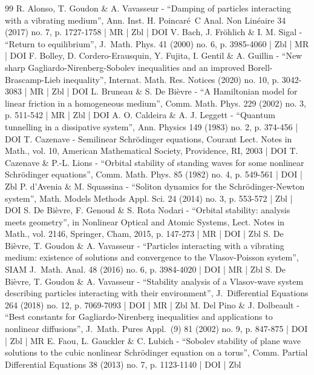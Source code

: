 \documentclass[10pt]{amsart}
\theoremstyle{definition}
\begin{document}
\begin{thebibliography}{99}
R. Alonso, T. Goudon \& A. Vavasseur - “Damping of particles interacting with a vibrating medium”, Ann. Inst. H. Poincaré C Anal. Non Linéaire 34 (2017) no. 7, p. 1727-1758 | MR | Zbl | DOI
V. Bach, J. Fröhlich \& I. M. Sigal - “Return to equilibrium”, J. Math. Phys. 41 (2000) no. 6, p. 3985-4060 | Zbl | MR | DOI
F. Bolley, D. Cordero-Erausquin, Y. Fujita, I. Gentil \& A. Guillin - “New sharp Gagliardo-Nirenberg-Sobolev inequalities and an improved Borell-Brascamp-Lieb inequality”, Internat. Math. Res. Notices (2020) no. 10, p. 3042-3083 | MR | Zbl | DOI
L. Bruneau \& S. De Bièvre - “A Hamiltonian model for linear friction in a homogeneous medium”, Comm. Math. Phys. 229 (2002) no. 3, p. 511-542 | MR | Zbl | DOI
A. O. Caldeira \& A. J. Leggett - “Quantum tunnelling in a dissipative system”, Ann. Physics 149 (1983) no. 2, p. 374-456 | DOI
T. Cazenave - Semilinear Schrödinger equations, Courant Lect. Notes in Math., vol. 10, American Mathematical Society, Providence, RI, 2003 | DOI
T. Cazenave \& P.-L. Lions - “Orbital stability of standing waves for some nonlinear Schrödinger equations”, Comm. Math. Phys. 85 (1982) no. 4, p. 549-561 | DOI | Zbl
P. d’Avenia \& M. Squassina - “Soliton dynamics for the Schrödinger-Newton system”, Math. Models Methods Appl. Sci. 24 (2014) no. 3, p. 553-572 | Zbl | DOI
S. De Bièvre, F. Genoud \& S. Rota Nodari - “Orbital stability: analysis meets geometry”, in Nonlinear Optical and Atomic Systems, Lect. Notes in Math., vol. 2146, Springer, Cham, 2015, p. 147-273 | MR | DOI | Zbl
S. De Bièvre, T. Goudon \& A. Vavasseur - “Particles interacting with a vibrating medium: existence of solutions and convergence to the Vlasov-Poisson system”, SIAM J. Math. Anal. 48 (2016) no. 6, p. 3984-4020 | DOI | MR | Zbl
S. De Bièvre, T. Goudon \& A. Vavasseur - “Stability analysis of a Vlasov-wave system describing particles interacting with their environment”, J. Differential Equations 264 (2018) no. 12, p. 7069-7093 | DOI | MR | Zbl
M. Del Pino \& J. Dolbeault - “Best constants for Gagliardo-Nirenberg inequalities and applications to nonlinear diffusions”, J. Math. Pures Appl. (9) 81 (2002) no. 9, p. 847-875 | DOI | Zbl | MR
E. Faou, L. Gauckler \& C. Lubich - “Sobolev stability of plane wave solutions to the cubic nonlinear Schrödinger equation on a torus”, Comm. Partial Differential Equations 38 (2013) no. 7, p. 1123-1140 | DOI | Zbl

\end{thebibliography}
\end{document}
